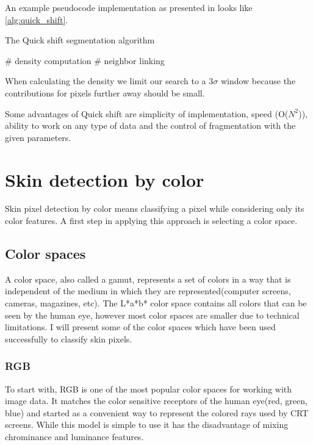 \documentclass[12pt]{report}
\begin{document}
	An example pseudocode implementation as presented in \cite{quickshift_gpu} looks like \ref{alg:quick_shift}.
	\begin{algorithm}
		\caption{The Quick shift segmentation algorithm}
		\label{alg:quick_shift}
		\# density computation\;
		\# neighbor linking\;
	\end{algorithm}
	When calculating the density we limit our search to a 3$\sigma$ window because the contributions for pixels further away should be small\cite{quickshift_gpu}.
	
	Some advantages of Quick shift are simplicity of implementation, speed (O($N^2$)), ability to work on any type of data and the control of fragmentation with the given parameters\cite{mode_seeking}. 
	
	\newpage
	\section{Skin detection by color}
	Skin pixel detection by color means classifying a pixel while considering only its color features. A first step in applying this approach is selecting a color space.
	
	\subsection{Color spaces}
	A color space, also called a gamut, represents a set of colors in a way that is independent of the medium in which they are represented(computer screens, cameras, magazines, etc)\cite{color_management_guide}. The L*a*b* color space contains all colors that can be seen by the human eye, however most color spaces are smaller due to technical limitations. I will present some of the color spaces which have been used successfully to classify skin pixels. 
	
	\subsubsection{RGB}
	To start with, RGB is one of the most popular color spaces for working with image data. It matches the color sensitive receptors of the human eye(red, green, blue) and started as a convenient way to represent the colored rays used by CRT screens\cite{survey_color_detection_techniques}. While this model is simple to use it has the disadvantage of mixing chrominance and luminance features\cite{survey_color_detection_techniques}.
	
\end{document}
